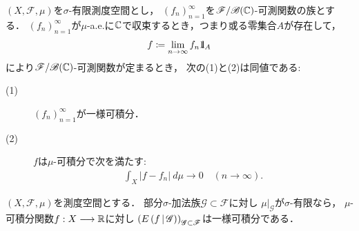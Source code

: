 	\begin{screen}
	\begin{thm}[一様可積分性と平均収束]\label{lem:uniformly_integrable_and_convergence_in_mean}
		$(X,\mathscr{F},\mu)$を$\sigma$-有限測度空間とし，
		$(f_n)_{n=1}^\infty$を$\mathscr{F}/\mathscr{B}(\mathbb{C})$-可測関数の族とする．
		$(f_n)_{n=1}^\infty$が$\mu$-a.e.に$\mathbb{C}$で収束するとき，つまり或る零集合$A$が存在して，
		\begin{align}
			f \coloneqq \lim_{n \to \infty} f_n \mbox{1}\hspace{-0.25em}\mbox{l}_A
		\end{align}
		により$\mathscr{F}/\mathscr{B}(\mathbb{C})$-可測関数が定まるとき，
		次の(1)と(2)は同値である:
		\begin{description}
			\item[(1)] $(f_n)_{n=1}^\infty$が一様可積分．
			\item[(2)] $f$は$\mu$-可積分で次を満たす:
				\begin{align}
					\int_X |f - f_n|\ d\mu 
					\longrightarrow 0
					\quad (n \longrightarrow \infty).
				\end{align}
		\end{description}
	\end{thm}
	\end{screen}
	
	\begin{screen}
	\begin{thm}[一様可積分性と条件付き期待値]\label{lem:uniformly_integrability_and_conditional_expectations}
		$(X,\mathscr{F},\mu)$を測度空間とする．
		部分$\sigma$-加法族$\mathscr{G} \subset \mathscr{F}$に対し
		$\left. \mu \right|_{\mathscr{G}}$が$\sigma$-有限なら，
		$\mu$-可積分関数$f:X \longrightarrow \mathbb{R}$に対し
		$\left( E\left( f \, \middle|\, \mathscr{G} \right) \right)_{\mathscr{G} \subset \mathscr{F}}$は一様可積分である．
	\end{thm}
	\end{screen}
	
